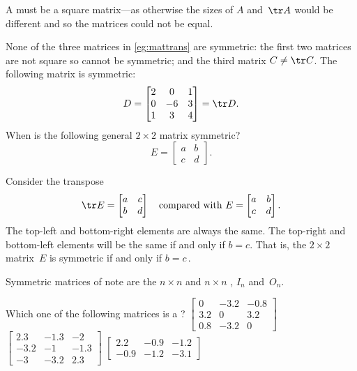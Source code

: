 A  must be a square matrix---as otherwise the sizes of \(A\) and~\(\tr A\) would be different and so the matrices could not be equal.


\begin{example} 
None of the three matrices in \autoref{eg:mattrans} are symmetric: the first two matrices are not square so cannot be symmetric; and the third matrix \(C\neq\tr C\).  
The following matrix is symmetric:
\begin{equation*}
D=\begin{bmatrix} 2 & 0 & 1\\ 0 & -6 & 3\\ 1 & 3 & 4  \end{bmatrix}
=\tr D.
\end{equation*}
When is the following general \(2\times2\) matrix symmetric?
\begin{equation*}
E=\begin{bmatrix} a&b\\c&d \end{bmatrix}.
\end{equation*}
\begin{solution} 
Consider the transpose
\begin{equation*}
\tr E=\begin{bmatrix} a&c\\b&d \end{bmatrix}
\quad\text{compared with }
E=\begin{bmatrix} a&b\\c&d \end{bmatrix}.
\end{equation*}
The top-left and bottom-right elements are always the same.
The top-right and bottom-left elements will be the same if and only if \(b=c\).
That is, the \(2\times 2\) matrix~\(E\) is symmetric if and only if \(b=c\)\,.
\end{solution}
\end{example}

Symmetric matrices of note are the \(n\times n\)  and \(n\times n\) , \(I_n\) and~\(O_n\).


\begin{activity}
Which one of the following matrices is a ?
{\(\begin{bmatrix} 0&-3.2&-0.8
\\3.2&0&3.2
\\0.8&-3.2&0 \end{bmatrix}\)}
{\(\begin{bmatrix} 2.3&-1.3&-2
\\-3.2&-1&-1.3
\\-3&-3.2&2.3 \end{bmatrix}\)}
{\(\begin{bmatrix} 2.2&-0.9&-1.2
\\-0.9&-1.2&-3.1 \end{bmatrix}\)}
\end{activity}
   



